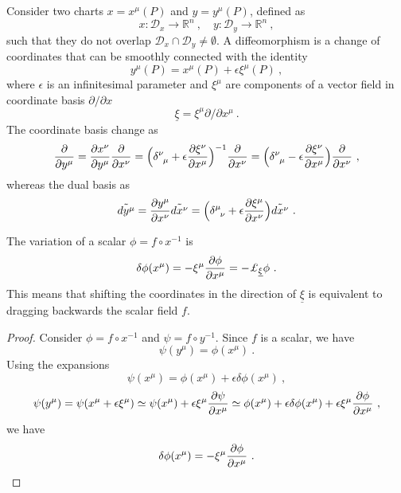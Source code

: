     Consider two charts $x = x^\mu (P)$ and $y = y^\mu (P)$, defined as
    \begin{equation*}
        x \colon \mathcal D_x \rightarrow \mathbb R^n ~, \quad y \colon \mathcal D_y \rightarrow \mathbb R^n ~, 
    \end{equation*}
    such that they do not overlap $\mathcal D_x \cap \mathcal D_y \neq \emptyset$. A diffeomorphism is a change of coordinates that can be smoothly connected with the identity 
    \begin{equation*}
        y^\mu (P) = x^\mu (P) + \epsilon \xi^\mu (P) ~,
    \end{equation*}
    where $\epsilon$ is an infinitesimal parameter and $\xi^\mu$ are components of a vector field in coordinate basis $\partial/\partial x$
    \begin{equation*}
        \underline \xi = \xi^\mu \partial/\partial x^\mu ~.
    \end{equation*}
    The coordinate basis change as 
    \begin{equation}\label{proof2}
        \pdv{}{y^\mu} = \pdv{x^\nu}{y^\mu} \pdv{}{x^\nu} = \Big ( \delta^\nu_{\phantom \nu \mu} + \epsilon \pdv{\xi^\nu}{x^\mu} \Big )^{-1} \pdv{}{x^\nu} = \Big (\delta^\nu_{\phantom \nu \mu} - \epsilon \pdv{\xi^\nu}{x^\mu} \Big ) \pdv{}{x^\nu} ~,
    \end{equation}
    whereas the dual basis as 
    \begin{equation}\label{proof3}
        \tilde{dy^\mu} = \pdv{y^\mu}{x^\nu} \tilde{dx^\nu} = \Big ( \delta^\mu_{\phantom \mu \nu} + \epsilon \pdv{\xi^\mu}{x^\nu} \Big ) \tilde{dx^\nu} ~.
    \end{equation}

    The variation of a scalar $\phi = f \circ x^{-1}$ is 
    \begin{equation*}
        \delta \phi (x^\mu) = - \xi^\mu \pdv{\phi}{x^\mu} = - \pounds_{\underline \xi} \phi ~.
    \end{equation*}
    This means that shifting the coordinates in the direction of $\underline \xi$ is equivalent to dragging backwards the scalar field $f$.
    \begin{proof}
        Consider $\phi = f \circ x^{-1}$ and $\psi = f \circ y^{-1}$. Since $f$ is a scalar, we have 
        \begin{equation*}
            \psi (y^\mu) = \phi(x^\mu) ~.
        \end{equation*}
        Using the expansions 
        \begin{equation*}
            \psi(x^\mu) = \phi(x^\mu) + \epsilon \delta \phi(x^\mu) ~, 
        \end{equation*}
        \begin{equation*}
            \psi (y^\mu) = \psi(x^\mu + \epsilon \xi^\mu) \simeq \psi(x^\mu) + \epsilon \xi^\mu \frac{\partial\psi}{\partial x^\mu} \simeq \phi(x^\mu) + \epsilon \delta \phi(x^\mu) + \epsilon \xi^\mu \frac{\partial\phi}{\partial x^\mu} ~,
        \end{equation*} 
        we have 
        \begin{equation*}
            \delta \phi(x^\mu) = - \xi^\mu \frac{\partial\phi}{\partial x^\mu} ~.
        \end{equation*}
    \end{proof}

